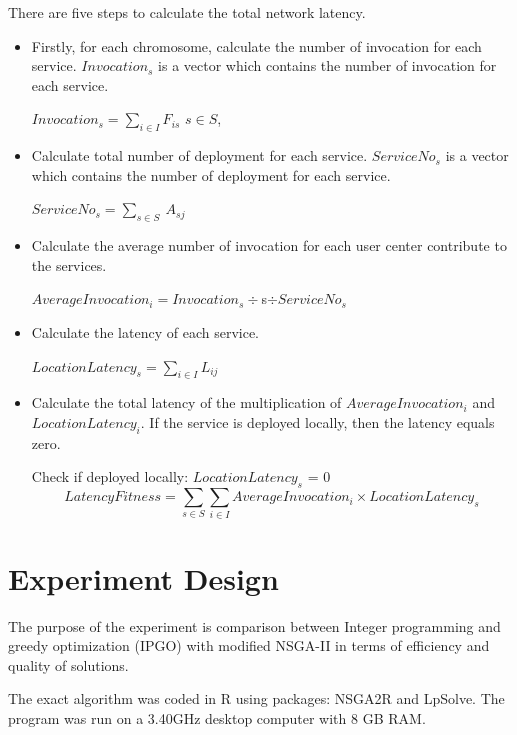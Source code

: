 \documentclass{llncs}
\begin{document}
There are five steps to calculate the total network latency.
\begin{itemize}
	\item Firstly, for each chromosome, calculate the number of invocation for each service. $Invocation_{s}$ is a vector which contains 
		the number of invocation for each service.
		\begin{center}
			$Invocation_{s} = \sum\limits_{i \in I} F_{is}$ $s \in S$,
		\end{center}
	\item Calculate total number of deployment for each service. $ServiceNo_{s}$ is a vector which contains the number of deployment for each service.
		\begin{center}
			$ServiceNo_{s} = \sum\limits_{s \in S}\ A_{sj}$
		\end{center}
	\item Calculate the average number of invocation for each user center contribute to the services.
		\begin{center}
			$AverageInvocation_{i} = Invocation_{s} \div $s$ \div ServiceNo_{s}$
		\end{center}
	\item Calculate the latency of each service.
		\begin{center}
			$LocationLatency_{s} = \sum\limits_{i \in I} L_{ij}$
		\end{center}
	\item Calculate the total latency of the multiplication of $AverageInvocation_{i}$ and $LocationLatency_{i}$.
		If the service is deployed locally, then the latency equals zero.
		\begin{center}
			Check if deployed locally: $LocationLatency_{s}$ = 0
		\begin{equation}
			LatencyFitness = \sum\limits_{s \in S}\sum\limits_{i \in I} AverageInvocation_{i} \times LocationLatency_{s}
		\end{equation}
		\end{center}
\end{itemize}

\section{Experiment Design}
\label{sec:experiment}
The purpose of the experiment is comparison between Integer programming and greedy optimization (IPGO) with modified NSGA-II in terms of efficiency and quality of solutions. 

The exact algorithm was coded in R using packages: NSGA2R and LpSolve. The program was run on a 3.40GHz 
desktop computer with 8 GB RAM.
\end{document}
